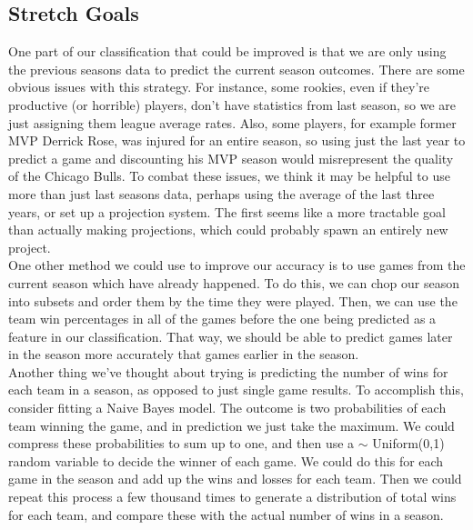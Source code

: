 \documentclass{article}
\begin{document}
	\subsection{Stretch Goals}
	One part of our classification that could be improved is that we are only using the previous seasons data to predict the current season outcomes. There are some obvious issues with this strategy. For instance, some rookies, even if they're productive (or horrible) players, don't have statistics from last season, so we are just assigning them league average rates. Also, some players, for example former MVP Derrick Rose, was injured for an entire season, so using just the last year to predict a game and discounting his MVP season would misrepresent the quality of the Chicago Bulls. To combat these issues, we think it may be helpful to use more than just last seasons data, perhaps using the average of the last three years, or set up a projection system. The first seems like a more tractable goal than actually making projections, which could probably spawn an entirely new project. \\

	One other method we could use to improve our accuracy is to use games from the current season which have already happened. To do this, we can chop our season into subsets and order them by the time they were played. Then, we can use the team win percentages in all of the games before the one being predicted as a feature in our classification. That way, we should be able to predict games later in the season more accurately that games earlier in the season. \\
		
	Another thing we've thought about trying is predicting the number of wins for each team in a season, as opposed to just single game results. To accomplish this, consider fitting a Naive Bayes model. The outcome is two probabilities of each team winning the game, and in prediction we just take the maximum. We could compress these probabilities to sum up to one, and then use a $\sim$ Uniform(0,1) random variable to decide the winner of each game. We could do this for each game in the season and add up the wins and losses for each team. Then we could repeat this process a few thousand times to generate a distribution of total wins for each team, and compare these with the actual number of wins in a season.
\end{document}
